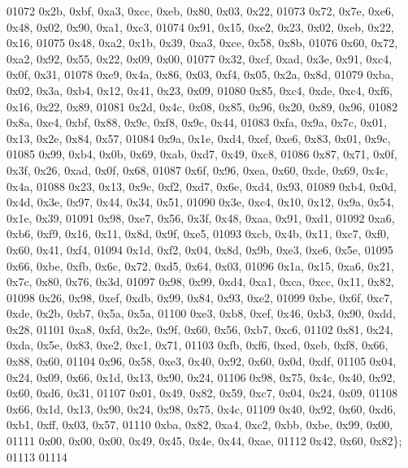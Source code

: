 \begin{DoxyCode}
01072   0x2b, 0xbf, 0xa3, 0xcc, 0xeb, 0x80, 0x03, 0x22,
01073   0x72, 0x7e, 0xe6, 0x48, 0x02, 0x90, 0xa1, 0xc3,
01074   0x91, 0x15, 0xe2, 0x23, 0x02, 0xeb, 0x22, 0x16,
01075   0x48, 0xa2, 0x1b, 0x39, 0xa3, 0xce, 0x58, 0x8b,
01076   0x60, 0x72, 0xa2, 0x92, 0x55, 0x22, 0x09, 0x00,
01077   0x32, 0xcf, 0xad, 0x3e, 0x91, 0xc4, 0x0f, 0x31,
01078   0xe9, 0x4a, 0x86, 0x03, 0xf4, 0x05, 0x2a, 0x8d,
01079   0xba, 0x02, 0x3a, 0xb4, 0x12, 0x41, 0x23, 0x09,
01080   0x85, 0xc4, 0xde, 0xc4, 0xf6, 0x16, 0x22, 0x89,
01081   0x2d, 0x4c, 0x08, 0x85, 0x96, 0x20, 0x89, 0x96,
01082   0x8a, 0xe4, 0xbf, 0x88, 0x9c, 0xf8, 0x9c, 0x44,
01083   0xfa, 0x9a, 0x7c, 0x01, 0x13, 0x2e, 0x84, 0x57,
01084   0x9a, 0x1e, 0xd4, 0xef, 0xe6, 0x83, 0x01, 0x9c,
01085   0x99, 0xb4, 0x0b, 0x69, 0xab, 0xd7, 0x49, 0xc8,
01086   0x87, 0x71, 0x0f, 0x3f, 0x26, 0xad, 0x0f, 0x68,
01087   0x6f, 0x96, 0xea, 0x60, 0xde, 0x69, 0x4c, 0x4a,
01088   0x23, 0x13, 0x9c, 0xf2, 0xd7, 0x6e, 0xd4, 0x93,
01089   0xb4, 0x0d, 0x4d, 0x3e, 0x97, 0x44, 0x34, 0x51,
01090   0x3e, 0xc4, 0x10, 0x12, 0x9a, 0x54, 0x1e, 0x39,
01091   0x98, 0xe7, 0x56, 0x3f, 0x48, 0xaa, 0x91, 0xd1,
01092   0xa6, 0xb6, 0xf9, 0x16, 0x11, 0x8d, 0x9f, 0xe5,
01093   0xcb, 0x4b, 0x11, 0xc7, 0xf0, 0x60, 0x41, 0xf4,
01094   0x1d, 0xf2, 0x04, 0x8d, 0x9b, 0xe3, 0xe6, 0x5e,
01095   0x66, 0xbe, 0xfb, 0x6c, 0x72, 0xd5, 0x64, 0x03,
01096   0x1a, 0x15, 0xa6, 0x21, 0x7c, 0x80, 0x76, 0x3d,
01097   0x98, 0x99, 0xd4, 0xa1, 0xca, 0xcc, 0x11, 0x82,
01098   0x26, 0x98, 0xef, 0xdb, 0x99, 0x84, 0x93, 0xe2,
01099   0xbe, 0x6f, 0xc7, 0xde, 0x2b, 0xb7, 0x5a, 0x5a,
01100   0xe3, 0xb8, 0xef, 0x46, 0xb3, 0x90, 0xdd, 0x28,
01101   0xa8, 0xfd, 0x2e, 0x9f, 0x60, 0x56, 0xb7, 0xc6,
01102   0x81, 0x24, 0xda, 0x5e, 0x83, 0xe2, 0xc1, 0x71,
01103   0xfb, 0xf6, 0xed, 0xeb, 0xf8, 0x66, 0x88, 0x60,
01104   0x96, 0x58, 0xe3, 0x40, 0x92, 0x60, 0x0d, 0xdf,
01105   0x04, 0x24, 0x09, 0x66, 0x1d, 0x13, 0x90, 0x24,
01106   0x98, 0x75, 0x4c, 0x40, 0x92, 0x60, 0xd6, 0x31,
01107   0x01, 0x49, 0x82, 0x59, 0xc7, 0x04, 0x24, 0x09,
01108   0x66, 0x1d, 0x13, 0x90, 0x24, 0x98, 0x75, 0x4c,
01109   0x40, 0x92, 0x60, 0xd6, 0xb1, 0xff, 0x03, 0x57,
01110   0xba, 0x82, 0xa4, 0xc2, 0xbb, 0xbe, 0x99, 0x00,
01111   0x00, 0x00, 0x00, 0x49, 0x45, 0x4e, 0x44, 0xae,
01112   0x42, 0x60, 0x82\};
01113 
01114 
\end{DoxyCode}

